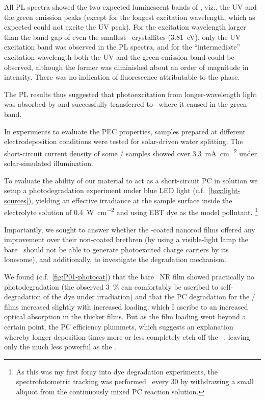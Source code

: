 \documentclass[draft,webedition,openright,titles,swedish,english]{LuaUUThesis}\usepackage[]{graphicx}\usepackage[]{xcolor}
\newcommand{\viz}{viz.}
\newcommand{\namely}{\viz}
\newcommand{\cf}{c.f.}
\begin{document}
All \gls{PL} spectra showed the two expected luminescent bands of \ZnO, \namely,
the UV and the green emission peaks (except for the longest excitation wavelength,
which as expected could not excite the UV peak).
For the excitation wavelength larger than the band gap of even the smallest
\ZnO\ crystallites (\qty{3.81}{\eV}), only the \gls{UV} excitation band
was observed in the \gls{PL} spectra, and for the \enquote{intermediate} excitation
wavelength both the \gls{UV} and the green emission band could be observed, although
the former was diminished about an order of magnitude in intensity.
There was no indication of fluorescence attributable to the  phase.

The \gls{PL} results thus suggested that photoexcitation
from longer-wavelength light was absorbed by  and successfully
transferred to \ZnO\ where it caused  in the green band.


In experiments to evaluate the \gls{PEC} properties, samples prepared at different
electrodeposition conditions were tested for solar-driven water splitting.
The short-circuit current density of some \ZnO/ samples showed over
\qty{3.3}{\mA\per\square\cm} under solar-simulated illumination.



To evaluate the ability of our material to act as a short-circuit \gls{PC}
in solution we setup a photodegradation experiment under blue \gls{LED} light
(\cf\ \cref{box:light-sources}), yielding an effective irradiance at the
sample surface inside the electrolyte solution of \qty{0.4}{\watt\per\square\cm}
and using \gls{EBT} dye as the model pollutant.%
\footnote{%
   As this was my first foray into dye degradation experiments,
   the spectrofotometric tracking was performed \exsitu\ every
   \qty{30}{\min} by withdrawing a small aliquot from the continuously mixed
   \gls{PC} reaction solution.
}

Importantly, we sought to answer whether the -coated nanorod films
offered any improvement over their non-coated brethren
(by using a visible-light lamp the bare \ZnO\ should not be able to generate
photoexcited charge carriers by its lonesome), and additionally, to investigate
the degradation mechanism.

We found (\cf\ \cref{fig:P01-photocat}) that the bare \ZnO\ \gls{NR} film
showed practically no photodegradation (the observed \qty{3}{\percent} can comfortably
be ascribed to self-degradation of the dye under irradiation)
and that the \gls{PC} degradation for the \ZnO/ films increased
slightly with increased  loading, which I ascribe to an increased
optical absorption in the thicker films.
But as the  film loading went beyond a certain point, the \gls{PC} efficiency
plummets, which suggests an explanation whereby longer deposition times more
or less completely etch off the \ZnO\ , leaving only
the much less powerful  as the .
\end{document}
